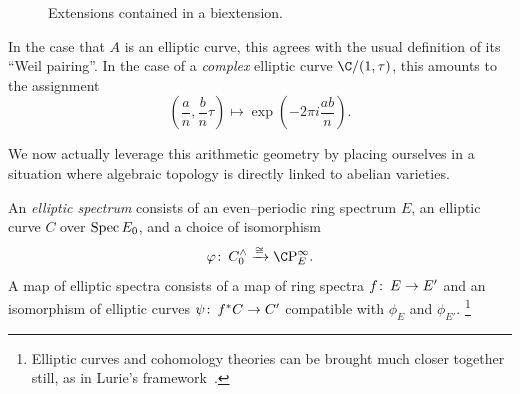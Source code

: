 \begin{figure}
\begin{center}
\hspace{0.5em}
\end{center}
\caption{Extensions contained in a biextension.}
\end{figure}

\begin{remark}
In the case that \(A\) is an elliptic curve, this agrees with the usual definition of its ``Weil pairing''.
In the case of a \emph{complex} elliptic curve \(\C / (1, \tau)\), this amounts to the assignment \[\left( \frac{a}{n}, \frac{b}{n} \tau \right) \mapsto \exp\left(-2\pi i \frac{ab}{n}\right).\]
\end{remark}

We now actually leverage this arithmetic geometry by placing ourselves in a situation where algebraic topology is directly linked to abelian varieties.

\begin{definition}\label{DefnEllipticSpectrum}
An \textit{elliptic spectrum} consists of an even--periodic ring spectrum \(E\), an elliptic curve \(C\) over \(\operatorname{Spec} E_0\), and a choice of isomorphism \[\phi\co C^\wedge_0 \xrightarrow{\cong} \CP^\infty_E.\]
A map of elliptic spectra consists of a map of ring spectra \(f\colon\thinspace E \to E'\) and an isomorphism of elliptic curves \(\psi\colon\thinspace f^* C \to C'\) compatible with \(\phi_E\) and \(\phi_{E'}\).%
\footnote{%
Elliptic curves and cohomology theories can be brought much closer together still, as in Lurie's framework~\cite[Sections 4 and 5.3]{LurieSurveyOfEll}.
}
\end{definition}

